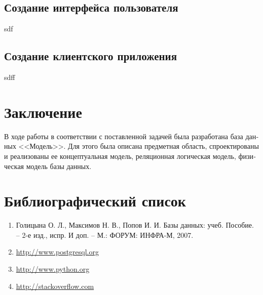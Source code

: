 \documentclass[a4paper, 12pt, titlepage]{article}
\begin{document}
\begin{otherlanguage}{russian}
\begin{enumerate}
\end{enumerate}
\subsection{Создание интерфейса пользователя}
sdf
\subsection{Создание клиентского приложения}
sdff

\section{Заключение}
\par В ходе работы в соответствии с поставленной задачей была разработана база данных <<Модель>>. Для этого была описана предметная область, спроектированы и реализованы ее концептуальная модель, реляционная логическая модель, физическая модель базы данных.
\section{Библиографический список}

\begin{enumerate}
\item Голицына О. Л., Максимов Н. В., Попов И. И. Базы данных: учеб. Пособие. – 2-е изд., испр. И доп. – М.: ФОРУМ: ИНФРА-М, 2007. 
\item \url{http://www.postgresql.org}
\item \url{http://www.python.org}
\item \url{http://stackoverflow.com}
\end{enumerate}


\end{otherlanguage}
\end{document}
